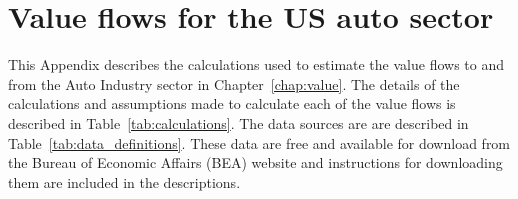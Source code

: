 %
%
%
\chapter{Value flows for the US auto sector}
\label{chap:auto_value_flows} 


This Appendix describes the calculations used to estimate the value flows to and from the Auto Industry sector in Chapter~\ref{chap:value}.  The details of the calculations and assumptions made to calculate 
each of the value flows is described in Table~\ref{tab:calculations}. The data sources are are described in Table~\ref{tab:data_definitions}. These data are free and available for download from the Bureau of Economic Affairs (BEA) website
and instructions for downloading them are included in the descriptions.



